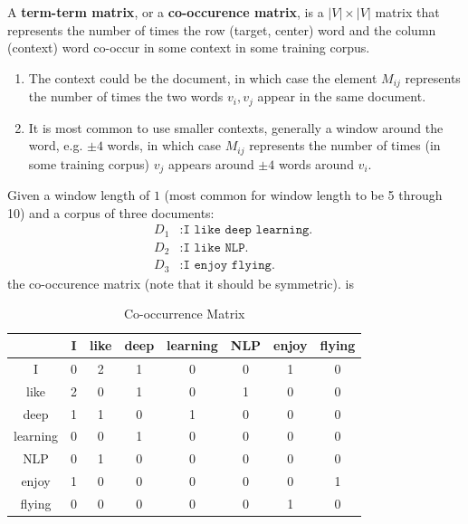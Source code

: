 \documentclass{article}
\begin{document}
      \begin{definition}
        \label{def:term-term-matrix}
        A \textbf{term-term matrix}, or a \textbf{co-occurence matrix}, is a $|V| \times |V|$ matrix that represents the number of times the row (target, center) word and the column (context) word co-occur in some context in some training corpus. 
        \begin{enumerate}
          \item The context could be the document, in which case the element $M_{ij}$ represents the number of times the two words $v_i, v_j$ appear in the same document. 
          \item It is most common to use smaller contexts, generally a window around the word, e.g. $\pm 4$ words, in which case $M_{ij}$ represents the number of times (in some training corpus) $v_j$ appears around $\pm 4$ words around $v_i$. 
        \end{enumerate}
      \end{definition}

      \begin{example}
        \label{ex:co-occurrence-matrix-for-a-window-of-length-one}
        Given a window length of $1$ (most common for window length to be 5 through 10) and a corpus of three documents: 
        \begin{align*}
            D_1 & : \texttt{I like deep learning. } \\
            D_2 & : \texttt{I like NLP. } \\
            D_3 & : \texttt{I enjoy flying.}
        \end{align*}
        the co-occurence matrix (note that it should be symmetric). is 
        \begin{table}[H]
        \centering
        \begin{tabular}{|c||*{7}{c|}}
        \hline
         & I & like & deep & learning & NLP & enjoy & flying \\ 
        \hline\hline
        I       & 0 & 2 & 1 & 0 & 0 & 1 & 0 \\ \hline
        like    & 2 & 0 & 1 & 0 & 1 & 0 & 0 \\ \hline
        deep    & 1 & 1 & 0 & 1 & 0 & 0 & 0 \\ \hline
        learning& 0 & 0 & 1 & 0 & 0 & 0 & 0 \\ \hline
        NLP     & 0 & 1 & 0 & 0 & 0 & 0 & 0 \\ \hline
        enjoy   & 1 & 0 & 0 & 0 & 0 & 0 & 1 \\ \hline
        flying  & 0 & 0 & 0 & 0 & 0 & 1 & 0 \\ \hline
        \end{tabular}
        \caption{Co-occurrence Matrix}
        \end{table}
      \end{example}
\end{document}
